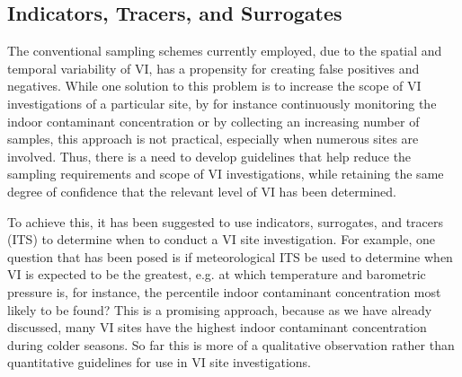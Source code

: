 \subsection{Indicators, Tracers, and Surrogates}

The conventional sampling schemes currently employed, due to the spatial and temporal variability of VI, has a propensity for creating false positives and negatives.
While one solution to this problem is to increase the scope of VI investigations of a particular site, by for instance continuously monitoring the indoor contaminant concentration or by collecting an increasing number of samples, this approach is not practical, especially when numerous sites are involved.
Thus, there is a need to develop guidelines that help reduce the sampling requirements and scope of VI investigations, while retaining the same degree of confidence that the relevant level of VI has been determined\cite{schuver_chlorinated_2018}.\par

To achieve this, it has been suggested to use indicators, surrogates, and tracers (ITS) to determine when to conduct a VI site investigation.
For example, one question that has been posed is if meteorological ITS be used to determine when VI is expected to be the greatest, e.g. at which temperature and barometric pressure is, for instance, the  percentile indoor contaminant concentration most likely to be found\cite{schuver_chlorinated_2018}?
This is a promising approach, because as we have already discussed, many VI sites have the highest indoor contaminant concentration during colder seasons.
So far this is more of a qualitative observation rather than quantitative guidelines for use in VI site investigations.\par
